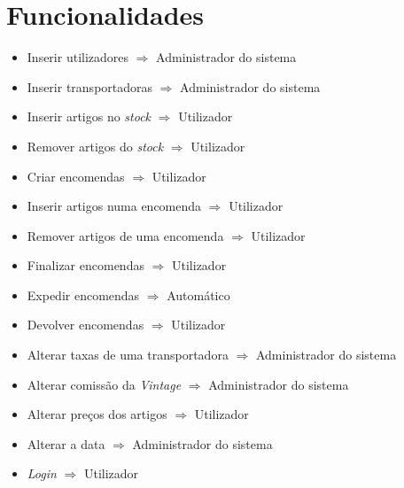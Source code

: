 \chapter{Funcionalidades}

    \begin{itemize}
        
        \item Inserir utilizadores $\Rightarrow$ Administrador do sistema
        
        \item Inserir transportadoras $\Rightarrow$ Administrador do sistema
        
        \item Inserir artigos no \textit{stock} $\Rightarrow$ Utilizador
        
        \item Remover artigos do \textit{stock} $\Rightarrow$ Utilizador
        
        \item Criar encomendas $\Rightarrow$ Utilizador
        
        \item Inserir artigos numa encomenda $\Rightarrow$ Utilizador
        
        \item Remover artigos de uma encomenda $\Rightarrow$ Utilizador
        
        \item Finalizar encomendas $\Rightarrow$ Utilizador
        
        \item Expedir encomendas $\Rightarrow$ Automático
        
        \item Devolver encomendas $\Rightarrow$ Utilizador
        
        \item Alterar taxas de uma transportadora $\Rightarrow$ Administrador do sistema
        
        \item Alterar comissão da \textit{Vintage} $\Rightarrow$ Administrador do sistema
        
        \item Alterar preços dos artigos $\Rightarrow$ Utilizador
        
        \item Alterar a data $\Rightarrow$ Administrador do sistema
        
        \item \textit{Login} $\Rightarrow$ Utilizador
        

\end{itemize}
